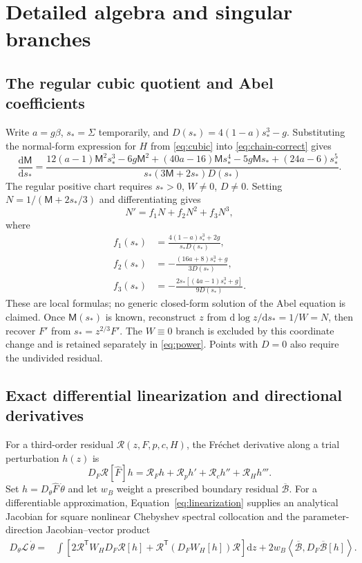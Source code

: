 \documentclass[11pt,a4paper,oneside]{report}
\numberwithin{equation}{chapter}
\newcommand{\R}{\mathcal R}
\newcommand{\dd}{\mathrm d}
\begin{document}
\label{end:main}\clearpage\appendix
\chapter{Detailed algebra and singular branches}\label{app:algebra}
\section{The regular cubic quotient and Abel coefficients}
Write $a=g\beta$, $s_*=\Sigma$ temporarily, and
$D(s_*)=4(1-a)s_*^3-g$. Substituting the normal-form expression for $H$ from \eqref{eq:cubic} into \eqref{eq:chain-correct} gives
\begin{equation}\label{eq:quotient-explicit}
\frac{\dd\mathsf M}{\dd s_*}=
\frac{12(a-1)\mathsf M^2s_*^3-6g\mathsf M^2
 +(40a-16)\mathsf M s_*^4-5g\mathsf M s_*
 +(24a-6)s_*^5}{s_*(3\mathsf M+2s_*)D(s_*)}.
\end{equation}
The regular positive chart requires $s_*>0$, $W\ne0$, $D\ne0$. Setting $N=1/(\mathsf M+2s_*/3)$ and differentiating gives
\begin{equation}
N'=f_1N+f_2N^2+f_3N^3,
\end{equation}
where
\begin{align}
f_1(s_*)&=\frac{4(1-a)s_*^3+2g}{s_*D(s_*)},\\
f_2(s_*)&=-\frac{(16a+8)s_*^3+g}{3D(s_*)},\\
f_3(s_*)&=-\frac{2s_*[(4a-1)s_*^3+g]}{9D(s_*)}.
\end{align}
These are local formulas; no generic closed-form solution of the Abel equation is claimed. Once $\mathsf M(s_*)$ is known, reconstruct $z$ from
$\dd\log z/\dd s_*=1/W=N$, then recover $F'$ from $s_*=z^{2/3}F'$. The $W\equiv0$ branch is excluded by this coordinate change and is retained separately in \eqref{eq:power}. Points with $D=0$ also require the undivided residual.

\section{Exact differential linearization and directional derivatives}
For a third-order residual $\R(z,F,p,c,H)$, the Fr\'echet derivative along a trial perturbation $h(z)$ is
\begin{equation}\label{eq:linearization}
D_F\R[\widehat F]h=\R_Fh+\R_ph'+\R_ch''+\R_Hh'''.
\end{equation}
Set $h=D_\theta\widehat F\,\dot\theta$ and let $w_B$ weight a prescribed boundary residual $\overline{\mathcal B}$. For a differentiable approximation, Equation~\eqref{eq:linearization} supplies an analytical Jacobian for square nonlinear Chebyshev spectral collocation and the parameter-direction Jacobian--vector product
\begin{align}\label{eq:directionalloss}
D_\theta\mathcal L\,\dot\theta
={}&\int\left[2\R^{\mathsf T}W_H D_F\R[h]
 +\R^{\mathsf T}(D_FW_H[h])\R\right]\dd z
 +2w_B\left\langle\overline{\mathcal B},
 D_F\overline{\mathcal B}[h]\right\rangle.
\end{align}
\end{document}

